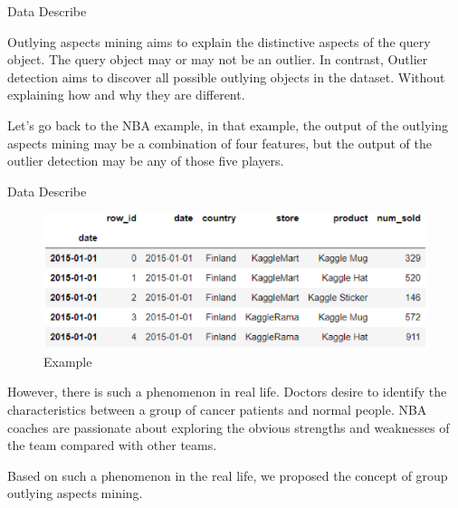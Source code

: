 \documentclass[
 size=14pt,
 paper=smartboard,  %
 mode=present, 		%
 display=slides, 	%
 style=tuliplab,  	%
 pauseslide,
 fleqn,leqno]{powerdot}
\begin{document}
\begin{slide}[toc=,bm=]{ Data Describe}
\begin{note}
Outlying aspects mining aims to 
explain the distinctive aspects of the query object. 
The query object may or may not be an outlier.
In contrast,
Outlier detection aims to discover all possible
outlying objects in the dataset.
Without explaining how and why they are different.

Let's go back to the NBA example,
in that example,
the output of the outlying aspects mining may be
a combination of four features,
but the output of the outlier detection may be any of those five players.
\end{note}

\end{slide}


\begin{slide}{ Data Describe}


\vspace{1.5cm}

\begin{figure}     
\centering     
\includegraphics[totalheight=2.8in]{001.eps}     
\caption{Example}     
\end{figure}


\begin{note}
However,
there is such a phenomenon in real life.
Doctors desire to identify the characteristics between
a group of cancer patients and normal people.
NBA coaches are passionate about exploring the obvious strengths and
weaknesses of the team compared with other teams.

Based on such a phenomenon in the real life,
we proposed the concept of group outlying aspects mining.
\end{note}

\end{slide}
\end{document}
